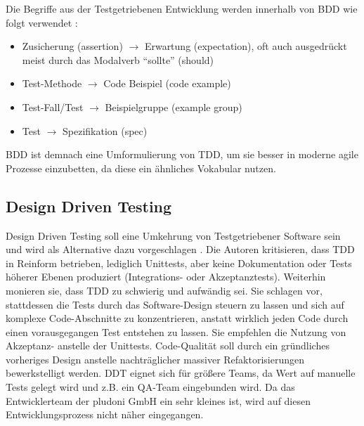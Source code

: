 Die Begriffe aus der Testgetriebenen Entwicklung werden innerhalb von BDD wie folgt verwendet \citep[S. 151]{chelimsky_rspec_2010}:
\begin{itemize}
 \item Zusicherung (assertion) $\to$ Erwartung (expectation), oft auch ausgedrückt meist durch das Modalverb "`sollte"' (should)
 \item Test-Methode $\to$ Code Beispiel (code example)
 \item Test-Fall/Test $\to$ Beispielgruppe (example group)
 \item Test $\to$ Spezifikation (spec)
\end{itemize}
BDD ist demnach eine Umformulierung von TDD, um sie besser in moderne agile Prozesse einzubetten, da diese ein ähnliches Vokabular nutzen.

\subsection{Design Driven Testing}
Design Driven Testing soll eine Umkehrung von Testgetriebener Software sein und wird als Alternative dazu vorgeschlagen \citep{stephens_design_2010}. Die Autoren kritisieren, dass TDD in Reinform betrieben, lediglich Unittests, aber keine Dokumentation oder Tests höherer Ebenen produziert (Integrations- oder Akzeptanztests). Weiterhin monieren sie, dass TDD zu schwierig und aufwändig sei. Sie schlagen vor, stattdessen die Tests durch das Software-Design steuern zu lassen und sich auf komplexe Code-Abschnitte zu konzentrieren, anstatt wirklich jeden Code durch einen vorausgegangen Test entstehen zu lassen. Sie empfehlen die Nutzung von Akzeptanz- anstelle der Unittests. Code-Qualität soll durch ein gründliches vorheriges Design anstelle nachträglicher massiver Refaktorisierungen bewerkstelligt werden.
DDT eignet sich für größere Teams, da Wert auf manuelle Tests gelegt wird und z.B. ein QA-Team eingebunden wird. Da das Entwicklerteam der pludoni GmbH ein sehr kleines ist, wird auf diesen Entwicklungsprozess nicht näher eingegangen.

